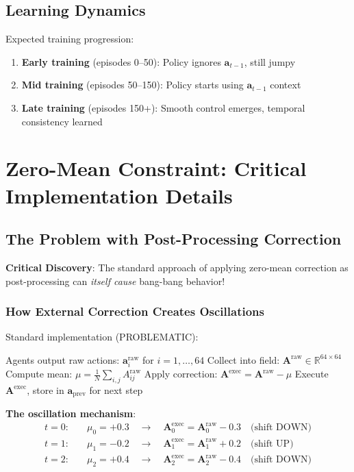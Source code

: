 \documentclass[11pt,a4paper]{article}
\newcommand{\R}{\mathbb{R}}
\theoremstyle{definition}
\begin{document}
\subsection{Learning Dynamics}

Expected training progression:
\begin{enumerate}
    \item \textbf{Early training} (episodes 0--50): Policy ignores $\mathbf{a}_{t-1}$, still jumpy
    \item \textbf{Mid training} (episodes 50--150): Policy starts using $\mathbf{a}_{t-1}$ context
    \item \textbf{Late training} (episodes 150+): Smooth control emerges, temporal consistency learned
\end{enumerate}

\section{Zero-Mean Constraint: Critical Implementation Details}

\subsection{The Problem with Post-Processing Correction}

\textbf{Critical Discovery}: The standard approach of applying zero-mean correction as post-processing can \emph{itself cause} bang-bang behavior!

\subsubsection{How External Correction Creates Oscillations}

Standard implementation (PROBLEMATIC):
\begin{algorithm}
\caption{Post-Processing Zero-Mean (Problematic)}
\begin{algorithmic}[1]
\STATE Agents output raw actions: $\mathbf{a}_i^{\text{raw}}$ for $i = 1, \ldots, 64$
\STATE Collect into field: $\mathbf{A}^{\text{raw}} \in \R^{64 \times 64}$
\STATE Compute mean: $\mu = \frac{1}{N}\sum_{i,j} A^{\text{raw}}_{ij}$
\STATE Apply correction: $\mathbf{A}^{\text{exec}} = \mathbf{A}^{\text{raw}} - \mu$
\STATE Execute $\mathbf{A}^{\text{exec}}$, store in $\mathbf{a}_{\text{prev}}$ for next step
\end{algorithmic}
\end{algorithm}

\textbf{The oscillation mechanism}:
\begin{align}
t=0: &\quad \mu_0 = +0.3 \quad \to \quad \mathbf{A}^{\text{exec}}_0 = \mathbf{A}^{\text{raw}}_0 - 0.3 \quad \text{(shift DOWN)} \\
t=1: &\quad \mu_1 = -0.2 \quad \to \quad \mathbf{A}^{\text{exec}}_1 = \mathbf{A}^{\text{raw}}_1 + 0.2 \quad \text{(shift UP)} \\
t=2: &\quad \mu_2 = +0.4 \quad \to \quad \mathbf{A}^{\text{exec}}_2 = \mathbf{A}^{\text{raw}}_2 - 0.4 \quad \text{(shift DOWN)}
\end{align}
\end{document}
